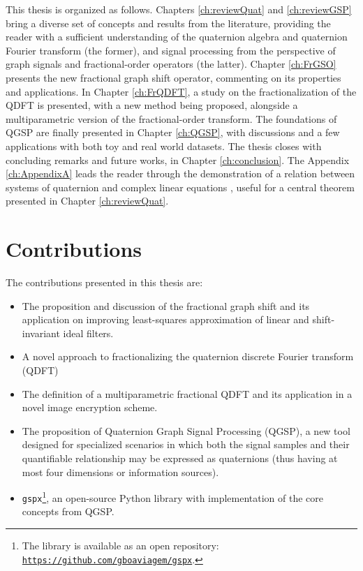 This thesis is organized as follows. Chapters \ref{ch:reviewQuat} and \ref{ch:reviewGSP} bring a diverse set of concepts and results from the literature, providing the reader with a sufficient understanding of the quaternion algebra and quaternion Fourier transform (the former), and signal processing from the perspective of graph signals and fractional-order operators (the latter).
Chapter \ref{ch:FrGSO} presents the new fractional graph shift operator, commenting on its properties and applications.
In Chapter \ref{ch:FrQDFT}, a study on the fractionalization of the QDFT is presented, with a new method being proposed, alongside a multiparametric version of the fractional-order transform.
The foundations of QGSP are finally presented in Chapter \ref{ch:QGSP}, with discussions and a few applications with both toy  and real world datasets.
The thesis closes with concluding remarks and future works, in Chapter \ref{ch:conclusion}. The Appendix \ref{ch:AppendixA} leads the reader through the demonstration of a relation between systems of quaternion and complex linear equations , useful for a central theorem presented in Chapter \ref{ch:reviewQuat}.

\section{Contributions}
The contributions presented in this thesis are:

\begin{itemize}[noitemsep]
    \item The proposition and discussion of the fractional graph shift and its application on improving least-squares approximation of linear and shift-invariant ideal filters.
    \item A novel approach to fractionalizing the quaternion discrete Fourier transform (QDFT)
    \item The definition of a multiparametric fractional QDFT and its application in a novel image encryption scheme.
    \item The proposition of Quaternion Graph Signal Processing (QGSP), a new tool designed for specialized scenarios in which both the signal samples and their quantifiable relationship may be expressed as quaternions (thus having at most four dimensions or information sources).
    \item \texttt{gspx}\footnote{The library is available as an open repository: \texttt{\url{https://github.com/gboaviagem/gspx}}.}, an open-source Python library with implementation of the core concepts from QGSP.
\end{itemize}

